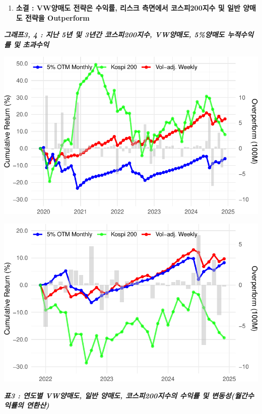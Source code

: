 \documentclass[
  a4paper,
  DIV=11,
  numbers=noendperiod]{scrreprt}
\providecommand{\tightlist}{%
  \setlength{\itemsep}{0pt}\setlength{\parskip}{0pt}}\usepackage{longtable,booktabs,array}
\begin{document}
\begin{enumerate}
\def\labelenumi{\arabic{enumi}.}
\setcounter{enumi}{2}
\tightlist
\item
  \textbf{소결 : VW양매도 전략은 수익률, 리스크 측면에서 코스피200지수
  및 일반 양매도 전략을 Outperform}
\end{enumerate}

\newpage

\textbf{\emph{그래프3, 4 : 지난 5년 및 3년간 코스피200지수, VW양매도,
5\%양매도 누적수익률 및 초과수익}}

\includegraphics{사례_과제_files/figure-pdf/unnamed-chunk-9-1.pdf}

\includegraphics{사례_과제_files/figure-pdf/unnamed-chunk-10-1.pdf}

\textbf{\emph{표3 : 연도별 VW양매도, 일반 양매도, 코스피200지수의 수익률
및 변동성(월간수익률의 연환산)}}
\end{document}
